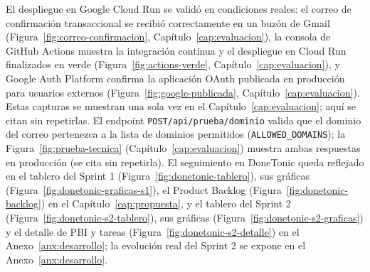 El despliegue en Google Cloud Run se validó en condiciones reales: el correo de confirmación transaccional se recibió correctamente en un buzón de Gmail (Figura~\ref{fig:correo-confirmacion}, Capítulo~\ref{cap:evaluacion}), la consola de GitHub Actions muestra la integración continua y el despliegue en Cloud Run finalizados en verde (Figura~\ref{fig:actions-verde}, Capítulo~\ref{cap:evaluacion}), y Google Auth Platform confirma la aplicación OAuth publicada en producción para usuarios externos (Figura~\ref{fig:google-publicada}, Capítulo~\ref{cap:evaluacion}). Estas capturas se muestran una sola vez en el Capítulo~\ref{cap:evaluacion}; aquí se citan sin repetirlas. El endpoint \texttt{POST\allowbreak /api/\allowbreak prueba/\allowbreak dominio} valida que el dominio del correo pertenezca a la lista de dominios permitidos (\texttt{ALLOWED\_DOMAINS}); la Figura~\ref{fig:prueba-tecnica} (Capítulo~\ref{cap:evaluacion}) muestra ambas respuestas en producción (se cita sin repetirla). El seguimiento en DoneTonic queda reflejado en el tablero del Sprint 1 (Figura~\ref{fig:donetonic-tablero}), sus gráficas (Figura~\ref{fig:donetonic-graficas-s1}), el Product Backlog (Figura~\ref{fig:donetonic-backlog}) en el Capítulo~\ref{cap:propuesta}, y el tablero del Sprint 2 (Figura~\ref{fig:donetonic-s2-tablero}), sus gráficas (Figura~\ref{fig:donetonic-s2-graficas}) y el detalle de PBI y tareas (Figura~\ref{fig:donetonic-s2-detalle}) en el Anexo~\ref{anx:desarrollo}; la evolución real del Sprint 2 se expone en el Anexo~\ref{anx:desarrollo}.
